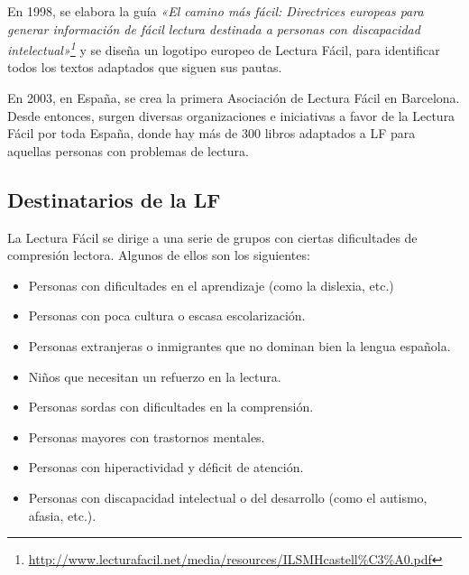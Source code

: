 En 1998, se elabora la guía \textit{«El camino más fácil: Directrices europeas para generar información de fácil lectura destinada a personas con discapacidad intelectual»\footnote{\href{http://www.lecturafacil.net/media/resources/ILSMHcastell\%C3\%A0.pdf}{http://www.lecturafacil.net/media/resources/ILSMHcastell\%C3\%A0.pdf}}} y se diseña un logotipo europeo de Lectura Fácil, para identificar todos los textos adaptados que siguen sus pautas.

 \setlength{\parskip}{10pt}
 
En 2003, en España, se crea la primera Asociación de Lectura Fácil en Barcelona. Desde entonces, surgen diversas organizaciones e iniciativas a favor de la Lectura Fácil por toda España, donde hay más de 300 libros adaptados a LF para aquellas personas con problemas de lectura.

\subsection{Destinatarios de la LF}
La Lectura Fácil se dirige a una serie de grupos con ciertas dificultades de compresión lectora. Algunos de ellos son los siguientes: 
 
\begin{itemize}
	\item Personas con dificultades en el aprendizaje (como la dislexia, etc.)	 
	\item Personas con poca cultura o escasa escolarización.	 
	\item Personas extranjeras o inmigrantes que no dominan bien la lengua española.
	\item Niños que necesitan un refuerzo en la lectura.
	\item Personas sordas con dificultades en la comprensión.
	\item Personas mayores con trastornos mentales.
	\item Personas con hiperactividad y  déficit de atención. 
	\item Personas con discapacidad intelectual o del desarrollo (como el autismo, afasia, etc.). 
\end{itemize}


